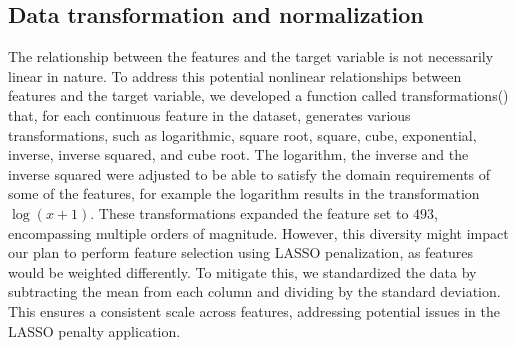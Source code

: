 \documentclass[hidelinks,12pt]{article}
\begin{document}
\subsection{Data transformation and normalization}
The relationship between the features and the target variable is not necessarily linear in nature. To address this potential nonlinear relationships between features and the target variable, we developed a function called transformations() that, for each continuous feature in the dataset, generates various transformations, such as logarithmic, square root, square, cube, exponential, inverse, inverse squared, and cube root. The logarithm, the inverse and the inverse squared were adjusted to be able to satisfy the domain requirements of some of the features, for example the logarithm results in the transformation $\log(x+1)$. These transformations expanded the feature set to $493$, encompassing multiple orders of magnitude. However, this diversity might impact our plan to perform feature selection using LASSO penalization, as features would be weighted differently. To mitigate this, we standardized the data by subtracting the mean from each column and dividing by the standard deviation. This ensures a consistent scale across features, addressing potential issues in the LASSO penalty application.
\end{document}
